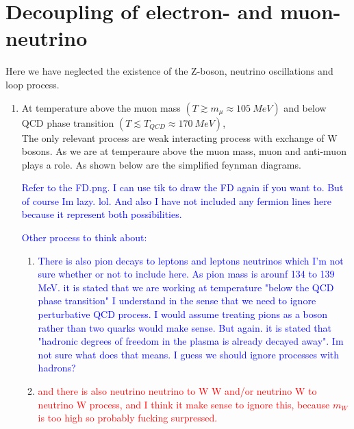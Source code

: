 \section{Decoupling of electron- and muon-neutrino}
Here we have neglected the existence of the Z-boson, neutrino oscillations and loop process.
\begin{enumerate}[label=\alph*)]
   \item At temperature above the muon mass $(T \gtrsim m_\mu \approx \SI{105}{MeV})$ and below  QCD phase transition $(T \lesssim T_{QCD} \approx \SI{170}{MeV})$, \\
The only relevant process are weak interacting process with exchange of W bosons. As we are at temperaure above   the muon mass, muon and anti-muon plays a role. As shown below are the simplified feynman diagrams. 

\textcolor{blue}{Refer to the FD.png. I can use tik to draw the FD again if you want to. But of course Im lazy. lol. And also I have not included any fermion lines here because it represent both possibilities.  \\}

\textcolor{blue}{Other process to think about:}
\begin{enumerate}
\item \textcolor{blue}{There is also pion decays to leptons and leptons neutrinos which I'm not sure whether or not to include here. As pion mass is arounf 134 to 139 MeV. it is stated that we are working at temperature "below the QCD phase transition" I understand in the sense that we need to ignore perturbative QCD process. I would assume treating pions as a boson rather than two quarks would make sense. But again. it is stated that "hadronic degrees of freedom in the plasma is already decayed away". Im not sure what does that means. I guess we should ignore processes with hadrons?}
\item \textcolor{red}{and there is also neutrino neutrino to W W and/or neutrino W to neutrino W process, and I think it make sense to ignore this, because $m_W$ is too high so probably fucking surpressed.}
\end{enumerate}


\end{enumerate}
